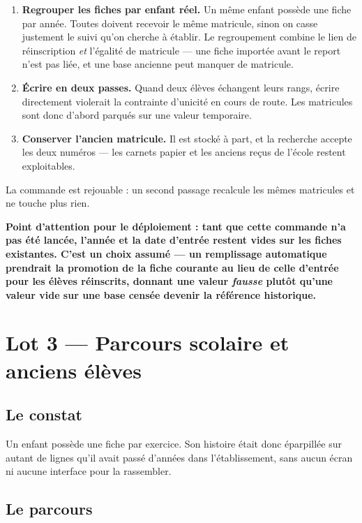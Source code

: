 \documentclass[11pt,a4paper]{report}
\newcommand{\encadre}[2]{%
  \begingroup
  \setlength{\fboxsep}{9pt}%
  \noindent\colorbox{sagibg}{%
    \begin{minipage}{\dimexpr\linewidth-2\fboxsep\relax}
    \textbf{\color{#1}#2}
    \end{minipage}}%
  \par\vspace{8pt}
  \endgroup}
\newcommand{\alerte}[1]{\encadre{sagired}{#1}}
\begin{document}
\begin{enumerate}
\item \textbf{Regrouper les fiches par enfant réel.} Un même enfant possède une
      fiche par année. Toutes doivent recevoir le même matricule, sinon on
      casse justement le suivi qu'on cherche à établir. Le regroupement combine
      le lien de réinscription \emph{et} l'égalité de matricule --- une fiche
      importée avant le report n'est pas liée, et une base ancienne peut
      manquer de matricule.
\item \textbf{Écrire en deux passes.} Quand deux élèves échangent leurs rangs,
      écrire directement violerait la contrainte d'unicité en cours de route.
      Les matricules sont donc d'abord parqués sur une valeur temporaire.
\item \textbf{Conserver l'ancien matricule.} Il est stocké à part, et la
      recherche accepte les deux numéros --- les carnets papier et les anciens
      reçus de l'école restent exploitables.
\end{enumerate}

La commande est rejouable : un second passage recalcule les mêmes matricules et
ne touche plus rien.

\alerte{Point d'attention pour le déploiement : tant que cette commande n'a pas
été lancée, l'année et la date d'entrée restent vides sur les fiches
existantes. C'est un choix assumé --- un remplissage automatique prendrait la
promotion de la fiche courante au lieu de celle d'entrée pour les élèves
réinscrits, donnant une valeur \emph{fausse} plutôt qu'une valeur vide sur une
base censée devenir la référence historique.}

\chapter{Lot 3 --- Parcours scolaire et anciens élèves}

\section{Le constat}

Un enfant possède une fiche par exercice. Son histoire était donc éparpillée
sur autant de lignes qu'il avait passé d'années dans l'établissement, sans
aucun écran ni aucune interface pour la rassembler.

\section{Le parcours}
\end{document}
